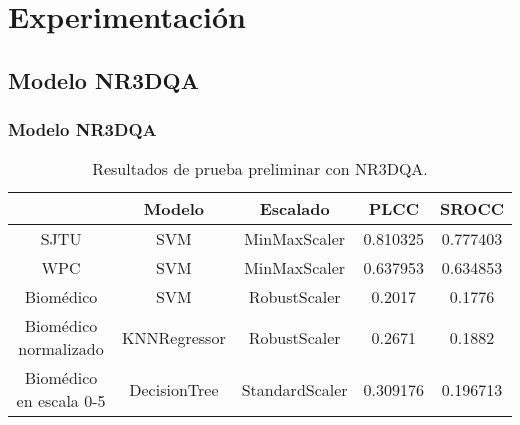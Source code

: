 \section{Experimentación}
\subsection{Modelo NR3DQA}
\begin{frame}
  \frametitle{Modelo NR3DQA\footnotemark[12]}
\begin{table}[htp]
  \small
  \begin{center}
    \hspace{-.5cm}
    \begin{tabular}[c]{|c|c|c|c|c|}
      \hline
      \rowcolor[HTML]{FFC702}
      \multicolumn{1}{|c|}{\textbf{Dataset}} & 
      \multicolumn{1}{|c|}{\textbf{Modelo}} & 
      \multicolumn{1}{|c|}{\textbf{Escalado}} & 
      \multicolumn{1}{|c|}{\textbf{PLCC}} &
      \multicolumn{1}{|c|}{\textbf{SROCC}} \\
      \hline
      SJTU & SVM & MinMaxScaler & 0.810325 & 0.777403 \\ 
      \hline 
      WPC & SVM & MinMaxScaler & 0.637953 & 0.634853 \\
      \hline
      Biomédico & SVM & RobustScaler & 0.2017 & 0.1776 \\
      \hline
      Biomédico normalizado & KNNRegressor & RobustScaler & 0.2671 & 0.1882  \\
      \hline
      Biomédico en escala 0-5 & DecisionTree & StandardScaler & 0.309176 & 0.196713 \\
      \hline
    \end{tabular}
  \end{center}
  \caption[Resultados de prueba preliminar con NR3DQA.]{
    Resultados de prueba preliminar con NR3DQA\footnotemark[12]. 
  }
  \label{tab:MedicalNR3DQA}
\end{table}

\end{frame}

